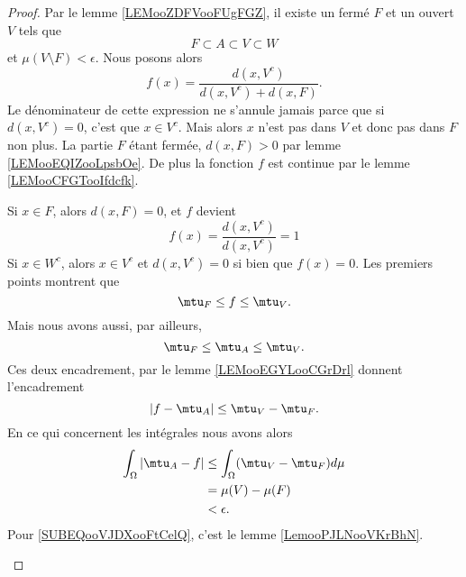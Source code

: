 	\begin{proof}
	Par le lemme \ref{LEMooZDFVooFUgFGZ}, il existe un fermé \( F\) et un ouvert \( V\) tels que
	\begin{equation}
	F\subset A\subset V\subset W
	\end{equation}
	et \( \mu(V\setminus F)<\epsilon\). Nous posons alors
	\begin{equation}
	f(x)=\frac{ d(x,V^c) }{ d(x,V^c)+d(x,F) }.
	\end{equation}
	Le dénominateur de cette expression ne s'annule jamais parce que si \( d(x,V^c)=0\), c'est que \( x\in V^c\). Mais alors \( x\) n'est pas dans \( V\) et donc pas dans \( F\) non plus. La partie \( F\) étant fermée, \( d(x,F)>0\) par lemme \ref{LEMooEQIZooLpsbOe}. De plus la fonction \( f\) est continue par le lemme \ref{LEMooCFGTooIfdcfk}.

	\begin{subproof}
	Si \( x\in F\), alors \( d(x,F)=0\), et \( f\) devient
	\begin{equation}
	f(x)=\frac{ d(x,V^c) }{ d(x,V^c) }=1
	\end{equation}
	Si \( x\in W^c\), alors \( x\in V^c\) et \( d(x,V^c)=0\) si bien que \( f(x)=0\).
	Les premiers points montrent que
	\begin{equation}
	\mtu_F\leq f\leq \mtu_V.
	\end{equation}
	Mais nous avons aussi, par ailleurs,
	\begin{equation}
	\mtu_{F}\leq \mtu_A\leq \mtu_V.
	\end{equation}
	Ces deux encadrement, par le lemme \ref{LEMooEGYLooCGrDrl} donnent l'encadrement
	\begin{equation}
	| f-\mtu_A |\leq \mtu_V-\mtu_F.
	\end{equation}
	En ce qui concernent les intégrales nous avons alors
	\begin{subequations}
	\begin{align}
	\int_{\Omega}| \mtu_A-f | & \leq \int_{\Omega}(\mtu_V-\mtu_F)d\mu      \\
		& =\mu(V)-\mu(F) \label{SUBEQooVJDXooFtCelQ} \\
		& <\epsilon.
		\end{align}
		\end{subequations}
		Pour \eqref{SUBEQooVJDXooFtCelQ}, c'est le lemme \ref{LemooPJLNooVKrBhN}.
		\end{subproof}
		\end{proof}

